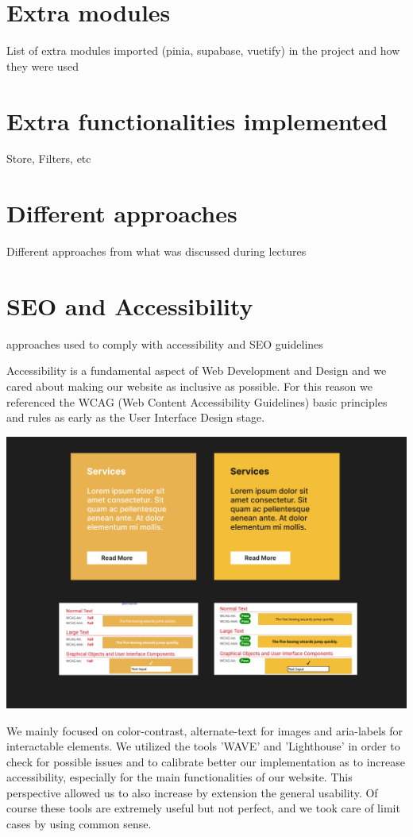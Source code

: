 \section{Extra modules}
List of extra modules imported (pinia, supabase, vuetify) in the project and how they were used

\section{Extra functionalities implemented}
Store, Filters, etc

\section{Different approaches}
Different approaches from what was discussed during lectures

\section{SEO and Accessibility}
approaches used to comply with accessibility and SEO guidelines

Accessibility is a fundamental aspect of Web Development and Design and we cared about making our
website as inclusive as possible. For this reason we referenced the WCAG (Web Content Accessibility Guidelines) basic principles and rules 
as early as the User Interface Design stage. 

\begin{center}
    \includegraphics[width=0.75\linewidth]{img/color-contrast-check.png} 
\end{center}

\vspace{1em}
We mainly focused on color-contrast, alternate-text for images and aria-labels for interactable elements. 
We utilized the tools 'WAVE' and 'Lighthouse' in order to check for possible issues and to calibrate better our
implementation as to increase accessibility, especially for the main functionalities of our website.
This perspective allowed us to also increase by extension the general usability.
Of course these tools are extremely useful but not perfect, and we took care of limit cases by using common sense.
\vspace{1em}

